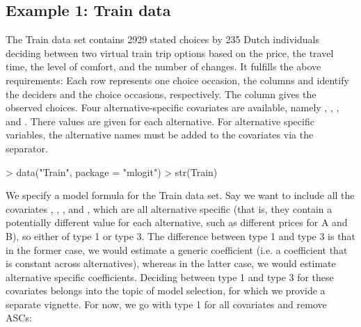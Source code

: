 \documentclass[article]{jss}
\begin{document}
\subsection{Example 1: Train data} \label{subsec:train_data_prep}

The Train data set contains 2929 stated choices by 235 Dutch individuals deciding between two virtual train trip options based on the price, the travel time, the level of comfort, and the number of changes. It fulfills the above requirements: Each row represents one choice occasion, the columns  and  identify the deciders and the choice occasions, respectively. The column  gives the observed choices. Four alternative-specific covariates are available, namely , , , and . There values are given for each alternative. For alternative specific variables, the alternative names must be added to the covariates via the \code{\_} separator.

\begin{Schunk}
\begin{Sinput}
> data("Train", package = "mlogit")
> str(Train)
\end{Sinput}
\end{Schunk}

We specify a model formula for the Train data set. Say we want to include all the covariates , , , and , which are all alternative specific (that is, they contain a potentially different value for each alternative, such as different prices for A and B), so either of type 1 or type 3. The difference between type 1 and type 3 is that in the former case, we would estimate a generic coefficient (i.e. a coefficient that is constant across alternatives), whereas in the latter case, we would estimate alternative specific coefficients. Deciding between type 1 and type 3 for these covariates belongs into the topic of model selection, for which we provide a separate vignette. For now, we go with type 1 for all covariates and remove ASCs:
\end{document}
